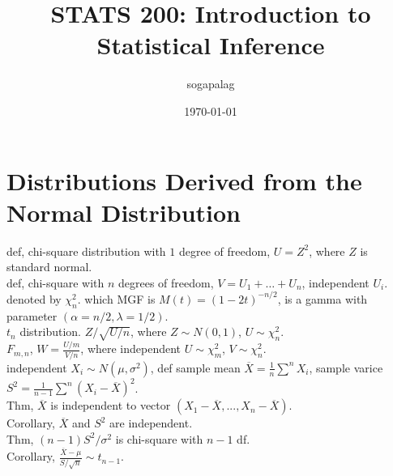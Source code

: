 \documentclass[paper=a4, fontsize=11pt]{scrartcl} %
\title{STATS 200: Introduction to Statistical Inference}
\author{sogapalag}
\date{\normalsize\today}
\numberwithin{equation}{section} %
\numberwithin{figure}{section} %
\numberwithin{table}{section} %
\begin{document}
\maketitle

\section{Distributions Derived from the Normal Distribution}
def, chi-square distribution with $1$ degree of freedom, $U=Z^2$, where $Z$ is standard normal.\\
def, chi-square with $n$ degrees of freedom, $V=U_1+\dots+U_n$, independent $U_i$. denoted by $\chi_n^2$. which MGF is $M(t)=(1-2t)^{-n/2}$, is a gamma with parameter $(\alpha=n/2, \lambda=1/2)$.\\
$t_n$ distribution. $Z/\sqrt{U/n}$, where $Z\sim N(0,1)$, $U\sim \chi_n^2$.\\
$F_{m,n}$, $W=\frac{U/m}{V/n}$, where independent $U\sim \chi_m^2$, $V\sim \chi_n^2$.\\
independent $X_i\sim N(\mu,\sigma^2)$, def sample mean $\overline{X}=\frac{1}{n}\sum^n X_i$, sample varice $S^2= \frac{1}{n-1}\sum^n (X_i-\overline{X})^2$.\\
Thm, $\overline{X}$ is independent to vector $(X_1-\overline{X},...,X_n-\overline{X})$.\\
Corollary, $\overline{X}$ and $S^2$ are independent.\\
Thm, $(n-1)S^2/\sigma^2$ is chi-square with $n-1$ df.\\
Corollary, $\frac{\overline{X}-\mu}{S/\sqrt{n}} \sim t_{n-1}$.\\
\end{document}
